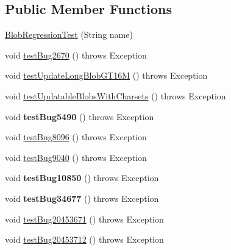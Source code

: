 \subsection*{Public Member Functions}
\begin{DoxyCompactItemize}
\item 
\mbox{\hyperlink{classtestsuite_1_1regression_1_1_blob_regression_test_a960d4c157630ea6a429f73ee43ca0c3a}{Blob\+Regression\+Test}} (String name)
\item 
void \mbox{\hyperlink{classtestsuite_1_1regression_1_1_blob_regression_test_ade5e73c4533b3bad28500f3ece35dc94}{test\+Bug2670}} ()  throws Exception 
\item 
void \mbox{\hyperlink{classtestsuite_1_1regression_1_1_blob_regression_test_a25e07d454d6ad14097ae4b5c5b1bab10}{test\+Update\+Long\+Blob\+G\+T16M}} ()  throws Exception 
\item 
void \mbox{\hyperlink{classtestsuite_1_1regression_1_1_blob_regression_test_aa201dca2fdcf014a75210d531656ab98}{test\+Updatable\+Blobs\+With\+Charsets}} ()  throws Exception 
\item 
\mbox{\label{classtestsuite_1_1regression_1_1_blob_regression_test_adbc904fc8caf8de0ac099afb41d6daa6}} 
void {\bfseries test\+Bug5490} ()  throws Exception 
\item 
void \mbox{\hyperlink{classtestsuite_1_1regression_1_1_blob_regression_test_aff4364ccb7977bcf4f76faf8ebd1a8b2}{test\+Bug8096}} ()  throws Exception 
\item 
void \mbox{\hyperlink{classtestsuite_1_1regression_1_1_blob_regression_test_ac14a4cb77c1dd15dae977435a20e0880}{test\+Bug9040}} ()  throws Exception 
\item 
\mbox{\label{classtestsuite_1_1regression_1_1_blob_regression_test_aacebe8bab74613e526801a7f2ab209d5}} 
void {\bfseries test\+Bug10850} ()  throws Exception 
\item 
\mbox{\label{classtestsuite_1_1regression_1_1_blob_regression_test_a921017ea8c988a3aa23f89888cdde3cb}} 
void {\bfseries test\+Bug34677} ()  throws Exception 
\item 
void \mbox{\hyperlink{classtestsuite_1_1regression_1_1_blob_regression_test_a3e0ce3dcc8dd672e82db74e248d09044}{test\+Bug20453671}} ()  throws Exception 
\item 
void \mbox{\hyperlink{classtestsuite_1_1regression_1_1_blob_regression_test_a044b5dc71a945042d8533a95202d17c4}{test\+Bug20453712}} ()  throws Exception 
\end{DoxyCompactItemize}
